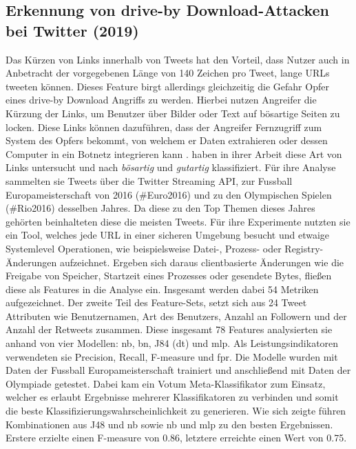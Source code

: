 \documentclass[
    12pt, %
    DIV10,
    ngerman, %
    a4paper, %
    oneside, %
    titlepage, %
    parskip=half, %
    headings=normal, %
    listof=totoc, %
    bibliography=totoc, %
    index=totoc, %
    captions=tableheading, %
    final %
]{scrreprt}
\begin{document}
\subsection{Erkennung von drive-by Download-Attacken bei Twitter (2019)}
Das Kürzen von Links innerhalb von Tweets hat den Vorteil, dass Nutzer auch in Anbetracht der vorgegebenen Länge von 140 Zeichen pro Tweet, lange URLs tweeten können. Dieses Feature birgt allerdings gleichzeitig die Gefahr Opfer eines drive-by Download Angriffs zu werden. Hierbei nutzen Angreifer die Kürzung der Links, um Benutzer über Bilder oder Text auf bösartige Seiten zu locken.
Diese Links können dazuführen, dass der Angreifer Fernzugriff zum System des Opfers bekommt, von welchem er Daten extrahieren oder dessen Computer in ein Botnetz integrieren kann \parencite{provos2007ghost}.
\textcite{Javed2019} haben in ihrer Arbeit diese Art von Links untersucht und nach \emph{bösartig} und \emph{gutartig} klassifiziert. Für ihre Analyse sammelten sie Tweets über die Twitter Streaming API, zur Fussball Europameisterschaft von 2016 (\#Euro2016) und zu den Olympischen Spielen (\#Rio2016) desselben Jahres. Da diese zu den Top Themen dieses Jahres gehörten beinhalteten diese die meisten Tweets. Für ihre Experimente nutzten sie ein Tool, welches jede URL in einer sicheren Umgebung besucht und etwaige Systemlevel Operationen, wie beispielsweise Datei-, Prozess- oder Registry-Änderungen aufzeichnet. Ergeben sich daraus clientbasierte Änderungen wie die Freigabe von Speicher, Startzeit eines Prozesses oder gesendete Bytes, flie{\ss}en diese als Features in die Analyse ein. Insgesamt werden dabei 54 Metriken aufgezeichnet. Der zweite Teil des Feature-Sets, setzt sich aus 24 Tweet Attributen wie Benutzernamen, Art des Benutzers, Anzahl an Followern und der Anzahl der Retweets zusammen. Diese insgesamt 78 Features analysierten sie anhand von vier Modellen: \acl{nb}, \acl{bn}, J84 (\acl{dt}) und \ac{mlp}. Als Leistungsindikatoren verwendeten sie Precision, Recall, F-measure und \ac{fpr}. Die Modelle wurden mit Daten der Fussball Europameisterschaft trainiert und anschlie{\ss}end mit Daten der Olympiade getestet. Dabei kam ein Votum Meta-Klassifikator zum  Einsatz, welcher es erlaubt Ergebnisse mehrerer Klassifikatoren zu verbinden und somit die beste Klassifizierungswahrscheinlichkeit zu generieren. Wie sich zeigte führen Kombinationen aus J48 und \ac{nb} sowie \ac{nb} und \ac{mlp} zu den besten Ergebnissen. Erstere erzielte einen F-measure von 0.86, letztere erreichte einen Wert von 0.75.
\\\\
\end{document}
